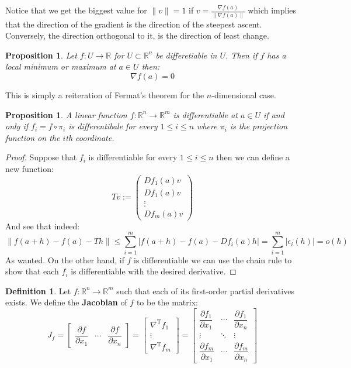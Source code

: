 \documentclass[11pt,a4paper]{article}
\theoremstyle{definition}
\newtheorem{definition}{Definition}[section]
\theoremstyle{plain}
\newtheorem{proposition}[theorem]{Proposition}
\newcommand{\R}{\mathbb{R}}
\begin{document}
	\newpage
	\noindent Notice that we get the biggest value for $\|v\| = 1$ if
	$v = \frac{\nabla f(a)}{\|\nabla f(a)\|}$ which implies that the direction
	of the gradient is the direction of the steepest ascent. Conversely,
	the direction orthogonal to it, is the direction of least change.
	\begin{proposition}
		Let $f \colon U \to \R$ for $U \subset \R^n$ be differetiable in $U$.
		Then if $f$ has a local minimum or maximum at $a \in U$ then:
		\[
			\nabla f(a) = 0
		\]
	\end{proposition}
	\noindent
	This is simply a reiteration of Fermat's theorem for the $n$-dimensional
	case.
	\begin{proposition}
		A linear function $f \colon \R^n \to \R^m$ is differentiable at 
		$a \in U$ if and only if $f_i = f \circ \pi_i$ is differentibale 
		for every $1 \le i \le n$ where $\pi_i$ is the projection function 
		on the $i$th coordinate.
	\end{proposition}
	\begin{proof}
		Suppose that $f_i$ is differentiable for every $1 \le i \le n$ then
		we can define a new function:
		\[
			Tv := \begin{pmatrix}Df_1(a)v \\ Df_1(a)v \\ 
			\vdots \\ Df_m(a)v \end{pmatrix}
		\]
		And see that indeed:
		\[
			\|f(a + h) - f(a) - Th\| \le 
			\sum_{i=1}^{m}|f(a + h) - f(a) - Df_i(a)h| = 
			\sum_{i=1}^{m}|\epsilon_i(h)| = o(h)
		\]
		As wanted. On the other hand, if $f$ is differentiable we can use
		the chain rule to show that each $f_i$ is differentiable with the
		desired derivative.
	\end{proof}
	\begin{definition}
		Let $f \colon \R^n \to \R^m$ such that each of its first-order partial 
		derivatives exists. We define the \textbf{Jacobian} of $f$ to be the 
		matrix:
		\[
			{J_{f}} ={\begin{bmatrix}{\dfrac {\partial {f} }
			{\partial x_{1}}}&\cdots &{\dfrac {\partial {f} }{\partial 
			x_{n}}}\end{bmatrix}}={\begin{bmatrix}\nabla ^{\mathrm {T} }f_{1}\\
			\vdots \\\nabla ^{\mathrm {T} }f_{m}\end{bmatrix}}={\begin{bmatrix}
			{\dfrac {\partial f_{1}}{\partial x_{1}}}&\cdots &{\dfrac {\partial 
			f_{1}}{\partial x_{n}}}\\\vdots &\ddots &\vdots \\{\dfrac {\partial 
			f_{m}}{\partial x_{1}}}&\cdots &{\dfrac {\partial f_{m}}{\partial 
			x_{n}}}\end{bmatrix}}
		\]
	\end{definition}
\end{document}
